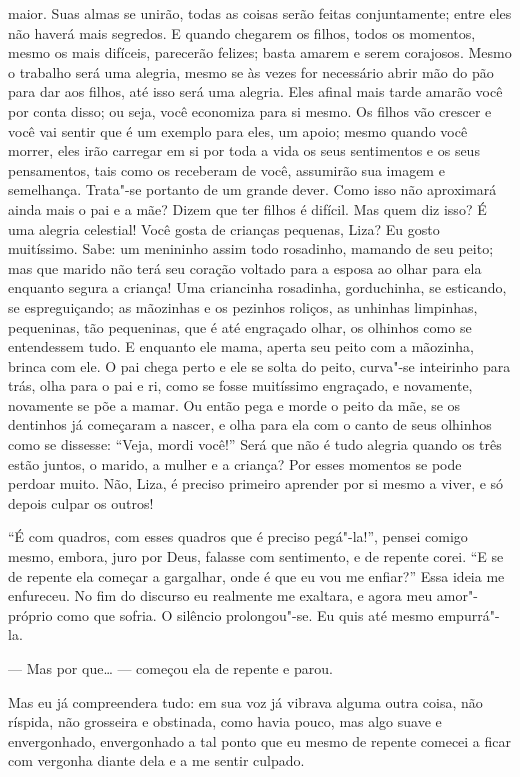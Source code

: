 maior. Suas almas se unirão, todas as coisas serão feitas
conjuntamente; entre eles não haverá mais segredos. E quando chegarem
os filhos, todos os momentos, mesmo os mais difíceis, parecerão
felizes; basta amarem e serem corajosos. Mesmo o trabalho será uma
alegria, mesmo se às vezes for necessário abrir mão do pão para dar aos
filhos, até isso será uma alegria. Eles afinal mais tarde amarão você
por conta disso; ou seja, você economiza para si mesmo. Os filhos vão
crescer e você vai sentir que é um exemplo para eles, um apoio; mesmo
quando você morrer, eles irão carregar em si por toda a vida os seus
sentimentos e os seus pensamentos, tais como os receberam de você,
assumirão sua imagem e semelhança. Trata"-se portanto de um grande
dever. Como isso não aproximará ainda mais o pai e a mãe? Dizem que ter
filhos é difícil. Mas quem diz isso? É uma alegria celestial! Você
gosta de crianças pequenas, Liza? Eu gosto muitíssimo. Sabe: um
menininho assim todo rosadinho, mamando de seu peito; mas que marido
não terá seu coração voltado para a esposa ao olhar para ela enquanto
segura a criança! Uma criancinha rosadinha, gorduchinha, se esticando,
se espreguiçando; as mãozinhas e os pezinhos roliços, as unhinhas
limpinhas, pequeninas, tão pequeninas, que é até engraçado olhar, os
olhinhos como se entendessem tudo. E enquanto ele mama, aperta seu
peito com a mãozinha, brinca com ele. O pai chega perto e ele se solta
do peito, curva"-se inteirinho para trás, olha para o pai e ri, como se
fosse muitíssimo engraçado, e novamente, novamente se põe a mamar. Ou
então pega e morde o peito da mãe, se os dentinhos já começaram a
nascer, e olha para ela com o canto de seus olhinhos como se dissesse:
“Veja, mordi você!” Será que não é tudo alegria quando os três estão
juntos, o marido, a mulher e a criança? Por esses momentos se pode
perdoar muito. Não, Liza, é preciso primeiro aprender por si mesmo a
viver, e só depois culpar os outros!

“É com quadros, com esses quadros que é preciso pegá"-la!”, pensei comigo
mesmo, embora, juro por Deus, falasse com sentimento, e de repente
corei. “E se de repente ela começar a gargalhar, onde é que eu vou me
enfiar?” Essa ideia me enfureceu. No fim do discurso eu realmente me
exaltara, e agora meu amor"-próprio como que sofria. O silêncio
prolongou"-se. Eu quis até mesmo empurrá"-la.

--- Mas por que\ldots{} --- começou ela de repente e parou.

Mas eu já compreendera tudo: em sua voz já vibrava alguma outra coisa,
não ríspida, não grosseira e obstinada, como havia pouco, mas algo
suave e envergonhado, envergonhado a tal ponto que eu mesmo de repente
comecei a ficar com vergonha diante dela e a me sentir culpado.


